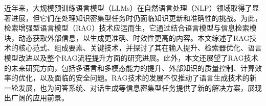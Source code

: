 	
\begin{chineseabstract}
近年来，大规模预训练语言模型（LLMs）在自然语言处理（NLP）领域取得了显著进展，但它们在处理知识密集型任务时仍面临知识更新和准确性的挑战。为此，检索增强型语言模型（RAG）技术应运而生，它通过结合语言模型与信息检索模块，动态获取外部信息，以生成更准确、时效性更高的内容。本文综述了RAG技术的核心范式、组成要素、关键技术，并探讨了其在输入提升、检索器优化、语言模型改进以及整个RAG流程提升方面的研究进展。此外，本文还展望了RAG技术的未来研究方向，包括多语言和多模态能力的提升、外部知识的质量控制、计算效率的优化，以及面临的安全问题。RAG技术的发展不仅推动了语言生成技术的新一轮发展，也为问答系统、对话生成等信息密集型任务提供了新的解决方案，展现出广阔的应用前景。

\end{chineseabstract}

